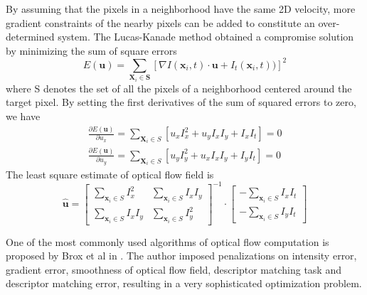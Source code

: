 By assuming that the pixels in a neighborhood have the same 2D velocity, more gradient constraints of the nearby pixels can be added to constitute an over-determined system. The Lucas-Kanade method \cite{Lucas81aniterative} obtained a compromise solution by minimizing the sum of square errors
\begin{equation}
E(\mathbf{u}) = \sum_{\mathbf{X}_{i} \in \mathbf{S}}[\nabla I(\mathbf{x}_{i}, t) \cdot \mathbf{u} + I_{t}(\mathbf{x}_{i}, t))]^{2}
\end{equation}
where S denotes the set of all the pixels of a neighborhood centered around the target pixel. By setting the first derivatives of the sum of squared errors to zero, we have
\begin{equation}
\begin{aligned}
\frac{\partial E(\mathbf{u})}{\partial u_{x}} = \sum_{\mathbf{X}_{i} \in S}[u_{x} I_{x}^{2} + u_{y}I_{x}I_{y} + I_{x}I_{t}] = 0 \\
\frac{\partial E(\mathbf{u})}{\partial u_{y}} = \sum_{\mathbf{X}_{i} \in S}[u_{y} I_{y}^{2} + u_{x}I_{x}I_{y} + I_{y}I_{t}] = 0
\end{aligned}
\end{equation}
The least square estimate of optical flow field is
\begin{equation}
\hat{\mathbf{u}} = \begin{bmatrix} \displaystyle\sum_{\mathbf{x}_{i} \in S} I_{x}^{2} & \displaystyle\sum_{\mathbf{x}_{i} \in S} I_{x} I_{y}\\ \displaystyle\sum_{\mathbf{x}_{i} \in S} I_{x} I_{y}& \displaystyle\sum_{\mathbf{x}_{i} \in S} I_{y}^{2} \end{bmatrix}^{-1} \cdot \begin{bmatrix} -\displaystyle\sum_{\mathbf{x}_{i} \in S} I_{x} I_{t}\\ -\displaystyle\sum_{\mathbf{x}_{i} \in S} I_{y} I_{t} \end{bmatrix}
\end{equation}

One of the most commonly used algorithms of optical flow computation is proposed by Brox et al in \cite{Bro11a}. The author imposed penalizations on intensity error, gradient error, smoothness of optical flow field, descriptor matching task and descriptor matching error, resulting in a very sophisticated optimization problem.



